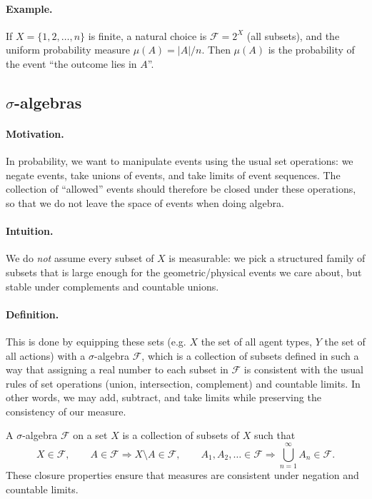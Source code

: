 \paragraph{Example.}
If $X=\{1,2,\dots,n\}$ is finite, a natural choice is $\mathcal{F}=2^X$ (all subsets), and the uniform probability
measure $\mu(A)=|A|/n$. Then $\mu(A)$ is the probability of the event ``the outcome lies in $A$''.

\subsection{$\sigma$-algebras}

\paragraph{Motivation.}
In probability, we want to manipulate events using the usual set operations: we negate events, take unions of events,
and take limits of event sequences. The collection of ``allowed'' events should therefore be closed under these
operations, so that we do not leave the space of events when doing algebra.

\paragraph{Intuition.}
We do \emph{not} assume every subset of $X$ is measurable: we pick a structured family of subsets that is large enough
for the geometric/physical events we care about, but stable under complements and countable unions.

\paragraph{Definition.}
This is done by equipping these sets (e.g. $X$ the set of all agent types, $Y$ the set of all actions) with a 
$\sigma$-algebra $\mathcal{F}$, which is a collection of subsets defined in such a way that assigning a real number 
to each subset in $\mathcal{F}$ is consistent with the usual rules of set operations (union, intersection, complement) 
and countable limits. In other words, we may add, subtract, and take limits while preserving the consistency of our measure.

A $\sigma$-algebra $\mathcal{F}$ on a set $X$ is a collection of subsets of $X$ such that
$$
X \in \mathcal{F}, \qquad
A \in \mathcal{F} \Rightarrow X \setminus A \in \mathcal{F}, \qquad
A_1,A_2,\dots \in \mathcal{F} \Rightarrow \bigcup_{n=1}^\infty A_n \in \mathcal{F}.
$$
These closure properties ensure that measures are consistent under negation and countable limits.

